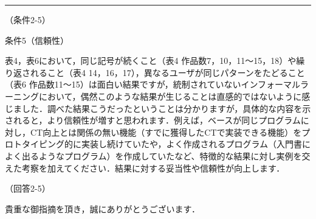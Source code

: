 \documentclass{jarticle} %
\def\subsection#1{ \vspace{1pc} {\gt #1} }
\def\nextans{ \vspace{2pc} \hrule }
\begin{document}
\newpage
\nextans
\subsection{（条件2-5）}

条件5（信頼性）

表4，表6において，同じ記号が続くこと（表4 作品数7，10，11〜15，18）や繰り返されること（表4 14，16，17），異なるユーザが同じパターンをたどること（表6 作品数11〜15）は面白い結果ですが，統制されていないインフォーマルラーニングにおいて，偶然このような結果が生じることは直感的ではないように感じました．調べた結果こうだったということは分かりますが，具体的な内容を示されると，より信頼性が増すと思われます．例えば，ベースが同じプログラムに対し，CT向上とは関係の無い機能（すでに獲得したCTで実装できる機能）をプロトタイピング的に実装し続けていたや，よく作成されるプログラム（入門書によく出るようなプログラム）を作成していたなど、特徴的な結果に対し実例を交えた考察を加えてください．結果に対する妥当性や信頼性が向上します．

\subsection{（回答2-5）}

貴重な御指摘を頂き，誠にありがとうございます．
\end{document}
